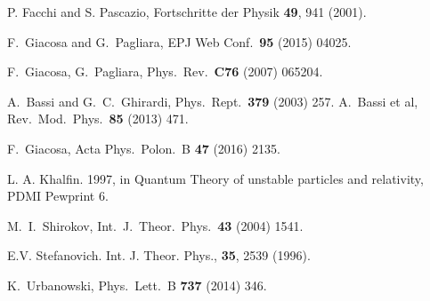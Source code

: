 \documentclass[12pt]{article}%
\begin{document}
\begin{thebibliography}{99}
P. Facchi and S. Pascazio, Fortschritte der Physik
\textbf{49}, 941 (2001).

F.~Giacosa and G.~Pagliara,
EPJ Web Conf.\ \textbf{95} (2015) 04025.


F.~Giacosa, G.~Pagliara,
Phys.\ Rev.\ \textbf{C76 } (2007) 065204.


A.~Bassi and G.~C.~Ghirardi,
Phys.\ Rept.\ \textbf{379} (2003) 257.
A.~Bassi et al,
Rev.\ Mod.\ Phys.\ \textbf{85} (2013) 471.


F.~Giacosa,
Acta Phys.\ Polon.\ B \textbf{47} (2016) 2135.


L. A. Khalfin. 1997, in Quantum Theory of unstable
particles and relativity, PDMI Pewprint 6.

M.~I.~Shirokov,
Int.\ J.\ Theor.\ Phys.\ \textbf{43} (2004) 1541.

E.V. Stefanovich. Int. J. Theor. Phys., \textbf{35},
2539 (1996).

K.~Urbanowski,
Phys.\ Lett.\ B \textbf{737} (2014) 346.

\end{thebibliography}
\end{document}
